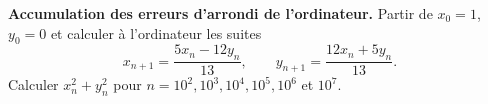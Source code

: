 \textbf{Accumulation des erreurs d'arrondi de l'ordinateur.} Partir de $x_0 = 1$, $y_0 = 0$ et calculer à l'ordinateur les suites
\[ x_{n+1} = \frac{5x_n - 12y_n}{13},\qquad y_{n+1} = \frac{12x_n + 5y_n}{13}. \]
Calculer $x_n^2 + y_n^2$ pour $n = 10^2, 10^3, 10^4, 10^5, 10^6$ et $10^7$.
